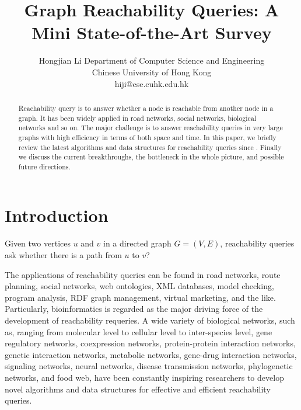 \documentclass[12pt,conference,compsocconf]{../IEEEtran}
\begin{document}
\title{Graph Reachability Queries: A Mini State-of-the-Art Survey}
\author
{
\IEEEauthorblockN
{
Hongjian Li
\IEEEauthorblockA
{
Department of Computer Science and Engineering\\
Chinese University of Hong Kong\\
hiji@cse.cuhk.edu.hk
}
}
}
\maketitle

\begin{abstract}

Reachability query is to answer whether a node is reachable from another node in a graph. It has been widely applied in road networks, social networks, biological networks and so on. The major challenge is to answer reachability queries in very large graphs with high efficiency in terms of both space and time. In this paper, we briefly review the latest algorithms and data structures for reachability queries since \citeyear{1063}. Finally we discuss the current breakthroughs, the bottleneck in the whole picture, and possible future directions.

\end{abstract}




\section{Introduction}

Given two vertices $u$ and $v$ in a directed graph $G = (V, E)$, reachability queries ask whether there is a path from $u$ to $v$?

The applications of reachability queries can be found in road networks, route planning, social networks, web ontologies, XML databases, model checking, program analysis, RDF graph management, virtual marketing, and the like. Particularly, bioinformatics is regarded as the major driving force of the development of reachability requeries. A wide variety of biological networks, such as, ranging from molecular level to cellular level to inter-species level, gene regulatory networks, coexpression networks, protein-protein interaction networks, genetic interaction networks, metabolic networks, gene-drug interaction networks, signaling networks, neural networks, disease transmission networks, phylogenetic networks, and food web, have been constantly inspiring researchers to develop novel algorithms and data structures for effective and efficient reachability queries.
\end{document}
